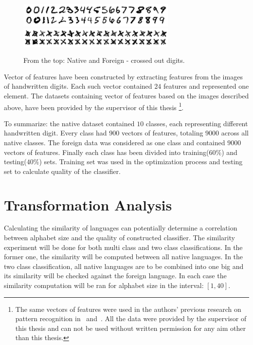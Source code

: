 \documentclass{mini}
\begin{document}
\begin{figure}[H]
    \includegraphics[width=0.7\textwidth]{./images/native.png}
    \includegraphics[width=0.7\textwidth]{./images/crossedout.png}
    \caption{From the top: Native and Foreign - crossed out digits.}
    \label{fig:native_foreign_png}
\end{figure}

Vector of features have been constructed by extracting features from the images of handwritten digits. Each such vector contained $24$ features and represented one element. The datasets containing vector of features based on the images described above, have been provided by the supervisor of this thesis
\footnote{The same vectors of features were used in the authors' previous research on pattern recognition in~\cite{rejector_geo} and~\cite{rejector_clusters}. All the data were provided by the supervisor of this thesis and can not be used without written permission for any aim other than this thesis.}.

To summarize: the native dataset contained $10$ classes, each representing different handwritten digit. Every class had $900$ vectors of features, totaling $9000$ across all native classes. The foreign data was considered as one class and contained $9000$ vectors of features. Finally each class has been divided into training($60\%$) and testing($40\%$) sets. Training set was used in the optimization process and testing set to calculate quality of the classifier.

\section{Transformation Analysis}

Calculating the similarity of languages can potentially determine a correlation between alphabet size and the quality of constructed classifier. The similarity experiment will be done for both multi class and two class classifications. In the former one, the similarity will be computed between all native languages. In the two class classification, all native languages are to be combined into one big and its similarity will be checked against the foreign language. In each case the similarity computation will be ran for alphabet size in the interval: $[1,40]$.
\end{document}
